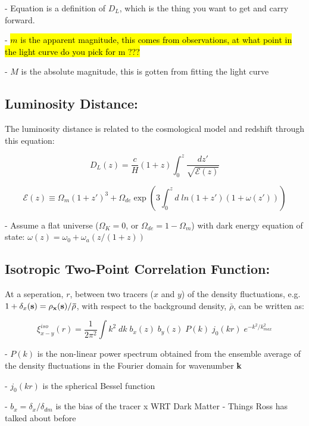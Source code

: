 \documentclass{article}
\begin{document}
- Equation is a definition of $D_L$, which is the thing you want to get and carry forward. 

- \hl{$m$ is the apparent magnitude, this comes from observations, at what point in the light curve do you pick for m ???} 

- $M$ is the absolute magnitude, this is gotten from fitting the light curve 

\clearpage
\subsection{Luminosity Distance:}

The luminosity distance is related to the cosmological model and redshift through this equation:

\begin{equation}
D_{L}(z) = \frac{c}{H}(1 + z) \int_{0}^{z} \frac{dz'}{\sqrt{\mathcal{E}(z)}}
\end{equation}

\begin{equation}
\mathcal{E}(z) \equiv \Omega_m(1+z')^3 + \Omega_{de} \exp(3 \int^z_0 d \; ln(1+z')(1+\omega (z')))
\end{equation}

- Assume a flat universe ($\Omega_K = 0$, or $\Omega_{de} = 1 - \Omega_m$) with dark energy equation of state: $\omega(z) = \omega_0 + \omega_a(z/(1+z))$


\subsection{Isotropic Two-Point Correlation Function:}

At a seperation, $r$, between two tracers ($x$ and $y$) of the density fluctuations, e.g. $1+\delta_x(\bf{s}) = \rho_x(\bf{s})/\bar{\rho}$, with respect to the background density, $\bar{\rho}$, can be written as: 

\begin{equation}
\xi^{iso}_{x-y}(r) = \frac{1}{2 \pi^2} \int k^2 \; dk \; b_x(z) \; b_y(z) \; P(k) \; j_0(kr) \; e^{-k^2/k^2_{max}}
\end{equation}

- $P(k)$ is the non-linear power spectrum obtained from the ensemble average of the density fluctuations in the Fourier domain for wavenumber $\bf{k}$

- $j_0(kr)$ is the spherical Bessel function

- $b_x = \delta_x/\delta_{dm}$ is the bias of the tracer x WRT Dark Matter - Things Ross has talked about before
\end{document}
